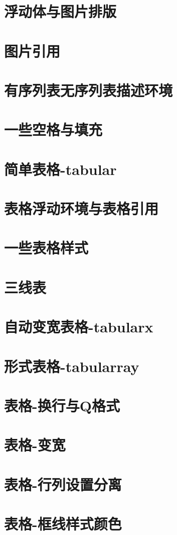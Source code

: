 \documentclass[12pt,a4paper]{ctexart}  %
\begin{document}
\section{浮动体与图片排版}
\section{图片引用}
\section{有序列表无序列表描述环境}
\section{一些空格与填充}
\section{简单表格-tabular}
\section{表格浮动环境与表格引用}
\section{一些表格样式}
\section{三线表}
\section{自动变宽表格-tabularx}
\section{形式表格-tabularray}
\section{表格-换行与Q格式}
\section{表格-变宽}
\section{表格-行列设置分离}
\section{表格-框线样式颜色}
\end{document}
